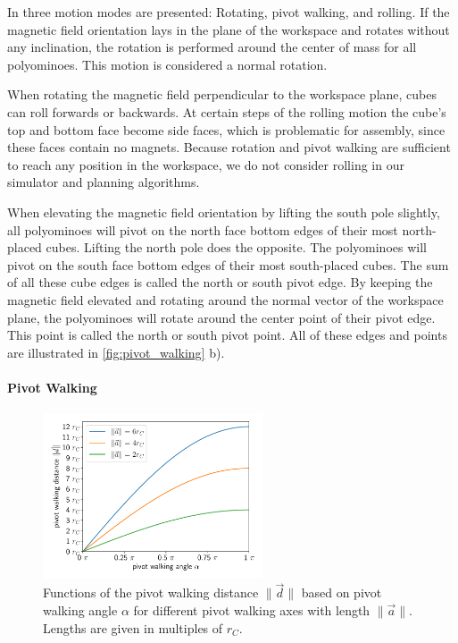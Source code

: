 In \cite{Bhattacharjee2022} three motion modes are presented: Rotating, pivot walking, and rolling.
If the magnetic field orientation lays in the plane of the workspace and rotates without any inclination, the rotation is performed around the center of mass for all polyominoes.
This motion is considered a normal rotation.

When rotating the magnetic field perpendicular to the workspace plane, cubes can roll forwards or backwards.
At certain steps of the rolling motion the cube's top and bottom face become side faces, which is problematic for assembly, since these faces contain no magnets.
Because rotation and pivot walking are sufficient to reach any position in the workspace, we do not consider rolling in our simulator and planning algorithms.

\newpage

When elevating the magnetic field orientation by lifting the south pole slightly, all polyominoes will pivot on the north face bottom edges of their most north-placed cubes.
Lifting the north pole does the opposite. The polyominoes will pivot on the south face bottom edges of their most south-placed cubes.
The sum of all these cube edges is called the north or south pivot edge.
By keeping the magnetic field elevated and rotating around the normal vector of the workspace plane, the polyominoes will rotate around the center point of their pivot edge.
This point is called the north or south pivot point.
All of these edges and points are illustrated in \autoref{fig:pivot_walking} b).


\paragraph{Pivot Walking}

\begin{figure}
	\centering
	\includegraphics[width=0.58\textwidth]{figures/plots/pivot_walking_angle.pdf}
	\caption[Functions of $\lVert \vec{d} \rVert$ based on $\alpha$ for different $\lVert \vec{a} \rVert$]{Functions of the pivot walking distance $\lVert \vec{d} \rVert$ based on pivot walking angle $\alpha$ for different pivot walking axes with length $\lVert \vec{a} \rVert$. Lengths are given in multiples of $r_C$.}
	\label{fig:pw_angle_plot}
\end{figure}


